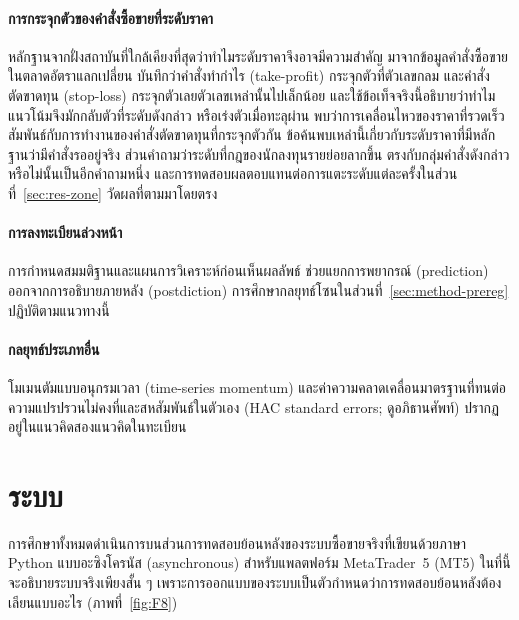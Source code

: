 \documentclass[11pt,a4paper]{article}
\newcommand{\tw}[1]{\texorpdfstring{\hspace{0pt}\mbox{#1}\hspace{0pt}}{#1}}
\begin{document}
\paragraph{การกระจุกตัวของ\tw{คำสั่ง}\tw{ซื้อขาย}ที่ระดับราคา}
\tw{หลักฐาน}จากฝั่งสถาบันที่ใกล้เคียงที่สุดว่าทำไมระดับราคาจึงอาจมีความสำคัญ
มาจากข้อมูล\tw{คำสั่ง}\tw{ซื้อขาย}ในตลาดอัตราแลกเปลี่ยน \citet{osler2003currency}
บันทึกว่า\tw{คำสั่ง}ทำกำไร (take-profit) กระจุกตัวที่ตัวเลขกลม และ\tw{คำสั่ง}ตัดขาดทุน (stop-loss)
กระจุกตัวเลยตัวเลขเหล่านั้นไป\tw{เล็กน้อย} และใช้ข้อเท็จจริงนี้อธิบายว่าทำไมแนวโน้มจึงมักกลับตัวที่ระดับดังกล่าว
หรือเร่งตัวเมื่อทะลุผ่าน \citet{osler2005stoploss}
พบว่าการเคลื่อนไหวของราคาที่รวดเร็วสัมพันธ์กับการทำงานของ\tw{คำสั่ง}ตัดขาดทุนที่กระจุกตัวกัน
\tw{ข้อค้นพบ}เหล่านี้เกี่ยวกับระดับราคาที่มี\tw{หลักฐาน}ว่ามี\tw{คำสั่ง}รออยู่จริง ส่วนคำถามว่าระดับที่กฎของนักลงทุน\tw{รายย่อย}ลากขึ้น
ตรงกับกลุ่ม\tw{คำสั่ง}ดังกล่าวหรือไม่นั้นเป็นอีกคำถามหนึ่ง
และการทดสอบผลตอบแทนต่อการแตะระดับแต่ละครั้งใน\tw{ส่วนที่}~\ref{sec:res-zone}
วัดผลที่ตามมาโดยตรง

\paragraph{การลงทะเบียน\tw{ล่วงหน้า}}
การกำหนดสมมติฐานและแผนการวิเคราะห์ก่อนเห็นผลลัพธ์
ช่วยแยกการพยากรณ์ (prediction) ออกจากการอธิบาย\tw{ภายหลัง} (postdiction) \citep{nosek2018prereg}
การศึกษากลยุทธ์โซนใน\tw{ส่วนที่}~\ref{sec:method-prereg} ปฏิบัติตามแนวทางนี้

\paragraph{กลยุทธ์ประเภทอื่น}
\tw{โมเมนตัม}แบบอนุกรมเวลา (time-series momentum) \citep{moskowitz2012tsmom}
และค่าความ\tw{คลาดเคลื่อน}มาตรฐานที่ทนต่อความแปรปรวนไม่คงที่และสหสัมพันธ์ในตัวเอง
(HAC standard errors; ดูอภิธานศัพท์) \citep{newey1987hac}
ปรากฏอยู่ในแนวคิดสองแนวคิดในทะเบียน

\section{ระบบ}
\label{sec:system}

การศึกษาทั้งหมดดำเนินการบนส่วนการทดสอบย้อนหลังของระบบ\tw{ซื้อขาย}จริงที่เขียนด้วยภาษา Python
แบบ\tw{อะซิงโครนัส} (asynchronous) สำหรับ\tw{แพลตฟอร์ม} MetaTrader~5 (MT5)
ในที่นี้จะอธิบายระบบจริงเพียงสั้น ๆ เพราะการออกแบบของระบบเป็นตัวกำหนดว่าการทดสอบย้อนหลังต้องเลียนแบบอะไร
(\tw{ภาพที่}~\ref{fig:F8})
\end{document}
